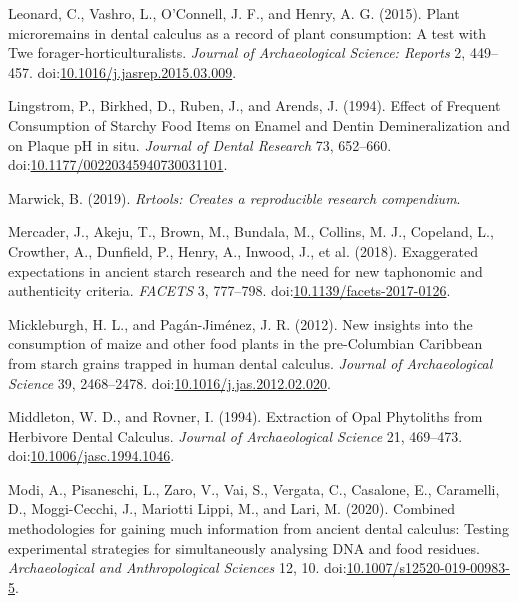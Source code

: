 \documentclass[utf8]{frontiers/frontiersSCNS}
\newlength{\cslhangindent}
\newlength{\cslentryspacingunit} %
\newenvironment{CSLReferences}[2] %
 {%
  \setlength{\parindent}{0pt}
  \ifodd #1
  \let\oldpar\par
  \def\par{\hangindent=\cslhangindent\oldpar}
  \fi
  \setlength{\parskip}{#2\cslentryspacingunit}
 }%
 {}
\begin{document}
\begin{CSLReferences}{1}{0}
\leavevmode{}%
Leonard, C., Vashro, L., O'Connell, J. F., and Henry, A. G. (2015). Plant microremains in dental calculus as a record of plant consumption: {A} test with {Twe} forager-horticulturalists. \emph{Journal of Archaeological Science: Reports} 2, 449--457. doi:\href{https://doi.org/10.1016/j.jasrep.2015.03.009}{10.1016/j.jasrep.2015.03.009}.

\leavevmode{}%
Lingstrom, P., Birkhed, D., Ruben, J., and Arends, J. (1994). Effect of {Frequent Consumption} of {Starchy Food Items} on {Enamel} and {Dentin Demineralization} and on {Plaque pH} in situ. \emph{Journal of Dental Research} 73, 652--660. doi:\href{https://doi.org/10.1177/00220345940730031101}{10.1177/00220345940730031101}.

\leavevmode{}%
Marwick, B. (2019). \emph{Rrtools: {Creates} a reproducible research compendium}.

\leavevmode{}%
Mercader, J., Akeju, T., Brown, M., Bundala, M., Collins, M. J., Copeland, L., Crowther, A., Dunfield, P., Henry, A., Inwood, J., et al. (2018). Exaggerated expectations in ancient starch research and the need for new taphonomic and authenticity criteria. \emph{FACETS} 3, 777--798. doi:\href{https://doi.org/10.1139/facets-2017-0126}{10.1139/facets-2017-0126}.

\leavevmode{}%
Mickleburgh, H. L., and Pagán-Jiménez, J. R. (2012). New insights into the consumption of maize and other food plants in the pre-{Columbian Caribbean} from starch grains trapped in human dental calculus. \emph{Journal of Archaeological Science} 39, 2468--2478. doi:\href{https://doi.org/10.1016/j.jas.2012.02.020}{10.1016/j.jas.2012.02.020}.

\leavevmode{}%
Middleton, W. D., and Rovner, I. (1994). Extraction of {Opal Phytoliths} from {Herbivore Dental Calculus}. \emph{Journal of Archaeological Science} 21, 469--473. doi:\href{https://doi.org/10.1006/jasc.1994.1046}{10.1006/jasc.1994.1046}.

\leavevmode{}%
Modi, A., Pisaneschi, L., Zaro, V., Vai, S., Vergata, C., Casalone, E., Caramelli, D., Moggi-Cecchi, J., Mariotti Lippi, M., and Lari, M. (2020). Combined methodologies for gaining much information from ancient dental calculus: Testing experimental strategies for simultaneously analysing {DNA} and food residues. \emph{Archaeological and Anthropological Sciences} 12, 10. doi:\href{https://doi.org/10.1007/s12520-019-00983-5}{10.1007/s12520-019-00983-5}.


\end{CSLReferences}
\end{document}
